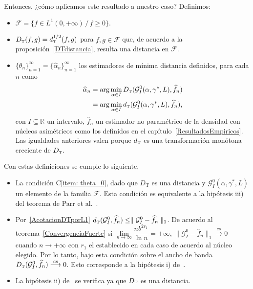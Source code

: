 Entonces, ¿cómo aplicamos este resultado a nuestro caso? Definimos:
\begin{itemize}
	\item $\mathcal{F}=\{f \in L^1(0,+\infty) \, / \, f \geq 0\}$.
	\item $D_{\text{\tiny{T}}}(f,g)=d_{\text{\tiny{T}}}^{1/2}(f,g)$ para $f,g \in \mathcal{F} $ que, de acuerdo a la proposición~\ref{DTdistancia}, resulta una distancia en $\mathcal{F}$.
	\item 
	$\{\theta_n\}_{n=1}^{\infty}=\{\widehat{\alpha}_n\}_{n=1}^{\infty}$ los estimadores de mínima distancia definidos, para cada $n$ como\\ 
	\begin{align*}
	\widehat{\alpha}_n&=\arg\min\limits_{\alpha \in I}D_{\text{\tiny{T}}}(\mathcal{G}_I^0(\alpha,\gamma^*,L),\widehat{f}_n)\\
	&=\arg\min\limits_{\alpha \in I}d_{\text{\tiny{T}}}(\mathcal{G}_I^0(\alpha,\gamma^*,L),\widehat{f}_n),
	\end{align*}
	con $I \subseteq \mathbb{R}$ un intervalo, $\widehat{f}_n$ un estimador no paramétrico de la densidad con núcleos asimétricos como los definidos en el capítulo~\ref{ResultadosEmpiricos}. Las igualdades anteriores valen porque $d_{\text{\tiny{T}}}$ es una transformación monótona creciente de $D_{\text{\tiny{T}}}.$  
\end{itemize}

Con estas definiciones se cumple lo siguiente.
\begin{itemize}
	\item La condición C\ref{item: theta_0}, dado que $D_{\text{T}}$ es una distancia y $\mathcal{G}_I^0(\alpha,\gamma^*,L)$ un elemento de la familia $\mathcal{F}$. Esta condición es equivalente a la hipótesis iii) del teorema de Parr et al.~\cite{parr1982}.
	
	\item Por~\eqref{AcotacionDTporL1} $d_{\text{\tiny{T}}}(\mathcal{G}_I^0,\widehat{f}_n) \leq \parallel \mathcal{G}_I^0 -\widehat{f}_n\parallel_1$. De acuerdo al teorema~\ref{ConvergenciaFuerte} si $\lim\limits_{n \to \infty} \dfrac{n b^{2r_1}}{\ln{n}}  = +\infty $, $\parallel \mathcal{G}_I^0 -\widehat{f}_n\parallel_1 \stackrel{cs}{\longrightarrow} 0$ cuando $n \to +\infty$ con $r_1$ el establecido en cada caso de acuerdo al núcleo elegido. Por lo tanto, bajo esta condición sobre el ancho de banda  $D_{\text{\tiny{T}}}(\mathcal{G}_I^0,\widehat{f}_n)\stackrel{cs}{\longrightarrow} 0$. Esto corresponde a la hipótesis i) de~\cite{parr1982}.
	
	\item La hipótesis ii) de~\cite{parr1982} se verifica ya que $D{\text{\tiny{T}}}$ es una distancia.
\end{itemize}

